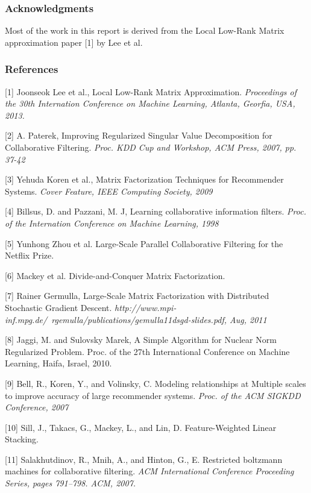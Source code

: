 \documentclass{article} %
\begin{document}
\subsubsection*{Acknowledgments}
Most of the work in this report is derived from the Local Low-Rank Matrix approximation paper [1] by Lee et al.

\subsubsection*{References}


\small{
[1] Joonseok Lee et al., Local Low-Rank Matrix Approximation. {\it Proceedings of the 30th Internation Conference on Machine Learning, Atlanta, Georfia, USA, 2013.} 

[2] A. Paterek, Improving Regularized Singular Value Decomposition for Collaborative Filtering. {\it Proc. KDD Cup and Workshop, ACM Press, 2007, pp. 37-42}

[3] Yehuda Koren et al., Matrix Factorization Techniques for Recommender Systems. {\it Cover Feature, IEEE Computing Society, 2009}

[4] Billsus, D. and Pazzani, M. J,  Learning collaborative information filters. {\it Proc. of the Internation Conference on Machine Learning, 1998}

[5] Yunhong Zhou et al. Large-Scale Parallel Collaborative Filtering for the Netflix Prize.

[6] Mackey et al. Divide-and-Conquer Matrix Factorization.

[7] Rainer Germulla, Large-Scale Matrix Factorization with Distributed Stochastic Gradient Descent. {\it http://www.mpi-inf.mpg.de/~rgemulla/publications/gemulla11dsgd-slides.pdf, Aug, 2011}

[8] Jaggi, M. and Sulovsky Marek, A Simple Algorithm for Nuclear Norm Regularized Problem. {Proc. of the 27th International Conference on Machine Learning, Haifa, Israel, 2010.}

[9] Bell, R., Koren, Y., and Volinsky, C. Modeling relationships at Multiple scales to improve accuracy of large recommender systems. {\it Proc. of the ACM SIGKDD Conference, 2007} 

[10] Sill, J., Takacs, G., Mackey, L., and Lin, D. Feature-Weighted Linear Stacking. 

[11] Salakhutdinov, R., Mnih, A., and Hinton, G., E. Restricted boltzmann machines for collaborative filtering. {\it ACM International Conference Proceeding Series, pages 791–798. ACM, 2007.}
}
\end{document}
